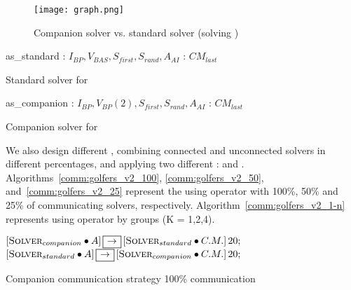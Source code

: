 \begin{figure}
\centering
\texttt{[image: graph.png]} 
\caption{Companion solver vs. standard solver (solving \sgp)}
\label{fig:solversgolfers}
\end{figure}

\begin{algorithm}[h]
\dontprintsemicolon
\SetNoline
{}
   as\_standard\;
\algoindent {} : $I_{BP}, V_{BAS}, S_{first}, S_{rand}, A_{AI}$ \;
\algoindent {} : $CM_{last}$ \;
\caption{Standard solver for \SGP}\label{as:golfers_full}
\end{algorithm}

\begin{algorithm}[!h]
\dontprintsemicolon
\SetNoline
{}
   as\_companion\;
\algoindent {} : $I_{BP}, V_{BP}(2), S_{first}, S_{rand}, A_{AI}$ \;
\algoindent {} : $CM_{last}$ \;
\caption{Companion solver for \SGP}\label{as:golfers_partial}
\end{algorithm}

We also design different \commstrs, combining connected and unconnected solvers in different percentages, and applying two different \commopers: \oneTone{} and \oneTn. Algorithms~\ref{comm:golfers_v2_100}, \ref{comm:golfers_v2_50}, and~\ref{comm:golfers_v2_25} represent the \commstrs{} using operator \oneTone{} with 100\%, 50\% and 25\% of communicating solvers, respectively. Algorithm~\ref{comm:golfers_v2_1-n} represents \commstrs{} using \oneTn{} operator by groups (K = 1,2,4).

\begin{algorithm}[!h]
\dontprintsemicolon
\SetNoline
$\left[\eqsolverposl{companion}\posldot A\right] \onetoone \left[\eqsolverposl{standard}\posldot C.M.\right]20;$\;
$\left[\eqsolverposl{standard}\posldot A\right] \onetoone \left[\eqsolverposl{companion}\posldot C.M.\right]20;$
\caption{Companion communication strategy 100\% communication}\label{comm:golfers_v2_100}
\end{algorithm}

